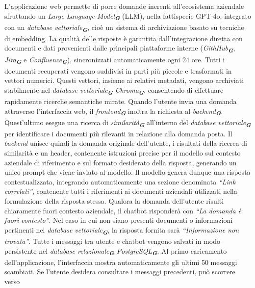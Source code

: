 L’applicazione web permette di porre domande inerenti all’ecosistema aziendale sfruttando un \emph{Large Language Model}\textsubscript{\textbf{\textit{G}}} (LLM), 
nella fattispecie GPT-4o, integrato con un \emph{database vettoriale}\textsubscript{\textbf{\textit{G}}}, cioè un sistema 
di archiviazione basato su tecniche di embedding.
La qualità delle risposte è garantita dall'integrazione diretta con documenti e dati provenienti dalle principali piattaforme interne 
(\emph{GithHub}\textsubscript{\textbf{\textit{G}}}, \emph{Jira}\textsubscript{\textbf{\textit{G}}} e \emph{Confluence}\textsubscript{\textbf{\textit{G}}}), sincronizzati 
automaticamente ogni 24 ore. Tutti i documenti recuperati vengono suddivisi in parti più piccole e trasformati in vettori numerici. Questi vettori, insieme ai relativi metadati, 
vengono archiviati stabilmente nel \emph{database vettoriale}\textsubscript{\textbf{\textit{G}}} \emph{Chroma}\textsubscript{\textbf{\textit{G}}}, consentendo di effettuare 
rapidamente ricerche semantiche mirate.
Quando l’utente invia una domanda attraverso l’interfaccia web, il \emph{frontend}\textsubscript{\textbf{\textit{G}}} inoltra la richiesta al 
\emph{backend}\textsubscript{\textbf{\textit{G}}}. Quest’ultimo esegue una ricerca di \emph{similarità}\textsubscript{\textbf{\textit{G}}} all'interno del \emph{database vettoriale}\textsubscript{\textbf{\textit{G}}} 
per identificare i documenti più rilevanti in relazione alla domanda posta. Il \emph{backend} unisce quindi la domanda originale dell’utente, 
i risultati della ricerca di similarità e un header, contenente istruzioni precise per il modello sul contesto aziendale di riferimento e sul formato desiderato della risposta, generando un unico prompt che viene inviato al modello.
Il modello genera dunque una risposta contestualizzata, integrando automaticamente una sezione denominata \emph{“Link correlati”}, contenente tutti i riferimenti ai documenti 
aziendali utilizzati nella formulazione della risposta stessa. Qualora la domanda dell'utente risulti chiaramente fuori contesto aziendale, il chatbot risponderà con 
\emph{“La domanda è fuori contesto”}. Nel caso in cui non siano presenti documenti o informazioni pertinenti nel \emph{database vettoriale}\textsubscript{\textbf{\textit{G}}}, la 
risposta fornita sarà \emph{“Informazione non trovata”}.
Tutte i messaggi tra utente e chatbot vengono salvati in modo persistente nel \emph{database relazionale}\textsubscript{\textbf{\textit{G}}} \emph{PostgreSQL}\textsubscript{\textbf{\textit{G}}}. Al primo caricamento 
dell’applicazione, l'interfaccia mostra automaticamente gli ultimi 50 messaggi scambiati. Se l'utente desidera consultare i messaggi precedenti, può scorrere verso 
